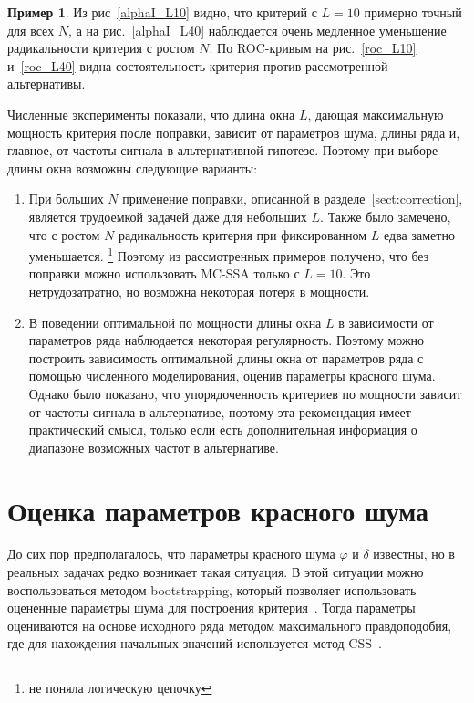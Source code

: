 \documentclass[specialist,
substylefile = spbu_report.rtx,
subf,href,colorlinks=true, 12pt]{disser}
\theoremstyle{definition}
\newtheorem{example}{Пример}
\begin{document}
\begin{example}
	Из рис~\ref{alphaI_L10} видно, что критерий с $L=10$ примерно точный для всех $N$, а на рис.~\ref{alphaI_L40} наблюдается очень медленное уменьшение радикальности критерия с ростом $N$. По ROC-кривым на рис.~\ref{roc_L10} и~\ref{roc_L40} видна состоятельность критерия против рассмотренной альтернативы.

\end{example}

Численные эксперименты показали, что длина окна $L$, дающая максимальную мощность критерия после поправки, зависит от параметров шума, длины ряда и, главное, от частоты сигнала в альтернативной гипотезе. Поэтому при выборе длины окна возможны следующие варианты:
\begin{enumerate}
	\item При больших $N$ применение поправки, описанной в разделе~\ref{sect:correction}, является трудоемкой задачей даже для небольших $L$. Также было замечено, что с ростом $N$ радикальность критерия при фиксированном $L$ едва заметно уменьшается. \footnote{не поняла логическую цепочку} Поэтому из рассмотренных примеров получено, что без поправки можно использовать MC-SSA только с $L=10$. Это нетрудозатратно, но возможна некоторая потеря в мощности.
	\item В поведении оптимальной по мощности длины окна $L$ в зависимости от параметров ряда наблюдается некоторая регулярность. Поэтому можно построить зависимость оптимальной длины окна от параметров ряда с помощью численного моделирования, оценив параметры красного шума. Однако было показано, что упорядоченность критериев по мощности зависит от частоты сигнала в альтернативе, поэтому эта рекомендация имеет практический смысл, только если есть дополнительная информация о диапазоне возможных частот в альтернативе.
\end{enumerate}

\section{Оценка параметров красного шума}\label{sect:phi_est}
До сих пор предполагалось, что параметры красного шума $\varphi$ и $\delta$ известны, но в реальных задачах редко возникает такая ситуация. В этой ситуации можно воспользоваться методом bootstrapping, который позволяет использовать оцененные параметры шума для построения критерия~\cite{Golyandina_2023}. Тогда параметры оцениваются на основе исходного ряда методом максимального правдоподобия, где для нахождения начальных значений используется метод CSS~\cite{ARIMA_est}.
\end{document}
